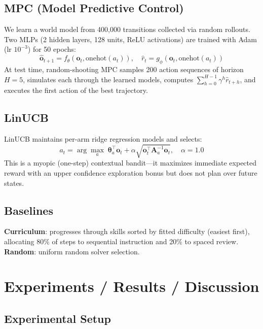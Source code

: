 \documentclass{article}
\begin{document}
\subsection{MPC (Model Predictive Control)}

We learn a world model from 400,000 transitions collected via random rollouts. Two MLPs (2 hidden layers, 128 units, ReLU activations) are trained with Adam (lr $10^{-3}$) for 50 epochs:
\begin{equation}
\hat{\mathbf{o}}_{t+1} = f_\theta(\mathbf{o}_t, \text{onehot}(a_t)), \quad \hat{r}_t = g_\phi(\mathbf{o}_t, \text{onehot}(a_t))
\end{equation}
At test time, random-shooting MPC samples 200 action sequences of horizon $H=5$, simulates each through the learned models, computes $\sum_{h=0}^{H-1}\gamma^h \hat{r}_{t+h}$, and executes the first action of the best trajectory.

\subsection{LinUCB}

LinUCB \citep{li2010linucb} maintains per-arm ridge regression models and selects:
\begin{equation}
a_t = \arg\max_a \;\boldsymbol{\theta}_a^\top \mathbf{o}_t + \alpha\sqrt{\mathbf{o}_t^\top \mathbf{A}_a^{-1}\mathbf{o}_t}, \quad \alpha=1.0
\end{equation}
This is a myopic (one-step) contextual bandit---it maximizes immediate expected reward with an upper confidence exploration bonus but does not plan over future states.

\subsection{Baselines}

\textbf{Curriculum}: progresses through skills sorted by fitted difficulty (easiest first), allocating 80\% of steps to sequential instruction and 20\% to spaced review.
\textbf{Random}: uniform random solver selection.

\section{Experiments / Results / Discussion}

\subsection{Experimental Setup}
\end{document}
